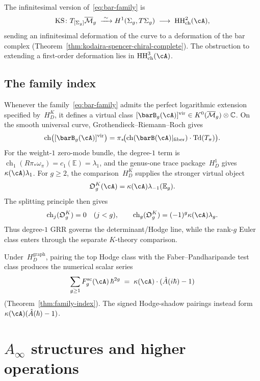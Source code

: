 The infinitesimal version of~\eqref{eq:bar-family} is
\begin{equation}\label{eq:ks-intro-hg}
\mathrm{KS} \colon T_{[\Sigma_g]}\overline{\mathcal{M}}_g
\;\xrightarrow{\;\sim\;}
H^1(\Sigma_g, T\Sigma_g)
\;\longrightarrow\;
\mathrm{HH}^2_{\mathrm{ch}}(\cA),
\end{equation}
sending an infinitesimal deformation of the curve to a deformation of
the bar complex
(Theorem~\ref{thm:kodaira-spencer-chiral-complete}). The obstruction
to extending a first-order deformation lies in
$\mathrm{HH}^3_{\mathrm{ch}}(\cA)$.

\subsection{The family index}
\label{subsec:why-ahat}

Whenever the family~\eqref{eq:bar-family} admits the perfect
logarithmic extension specified by~$H_D^K$, it defines a virtual class
$[\barB_g(\cA)]^{\mathrm{vir}}
\in K^0(\overline{\mathcal{M}}_g)\otimes\mathbb C$.
On the smooth universal curve, Grothendieck--Riemann--Roch gives
\[
\mathrm{ch}\bigl([\barB_g(\cA)]^{\mathrm{vir}}\bigr)
= \pi_*\!\bigl(\mathrm{ch}(\barB(\cA)|_{\mathrm{fiber}})
\cdot \mathrm{Td}(T_\pi)\bigr).
\]
For the weight-$1$ zero-mode bundle, the degree-$1$ term is
$\operatorname{ch}_1(R\pi_*\omega_\pi) = c_1(\mathbb{E}) = \lambda_1$,
and the genus-one trace package~$H_D^1$ gives
$\kappa(\cA)\lambda_1$.
For $g\geq2$, the comparison~$H_D^K$ supplies the stronger virtual
object
\[
 \mathfrak O_g^K(\cA)=\kappa(\cA)\lambda_{-1}(\mathbb E_g).
\]
The splitting principle then gives
\[
 \operatorname{ch}_j(\mathfrak O_g^K)=0\quad(j<g),
 \qquad
 \operatorname{ch}_g(\mathfrak O_g^K)
 =(-1)^g\kappa(\cA)\lambda_g.
\]
Thus degree-$1$ GRR governs the determinant/Hodge line, while the
rank-$g$ Euler class enters through the separate $K$-theory
comparison.

Under~$H_D^{\mathrm{graph}}$, pairing the top Hodge class with the
Faber--Pandharipande test class produces the numerical scalar series
\[
\sum_{g \geq 1} F_g^{\mathrm{sc}}(\cA)\,\hbar^{2g}
\;=\;
\kappa(\cA) \cdot (\hat{A}(i\hbar) - 1)
\]
\textup{(}Theorem~\textup{\ref{thm:family-index}}\textup{)}.
The signed Hodge-shadow pairings instead form
$\kappa(\cA)(\hat A(\hbar)-1)$.

\section{\texorpdfstring{$A_\infty$ structures and higher operations}{A-infinity structures and higher operations}}

